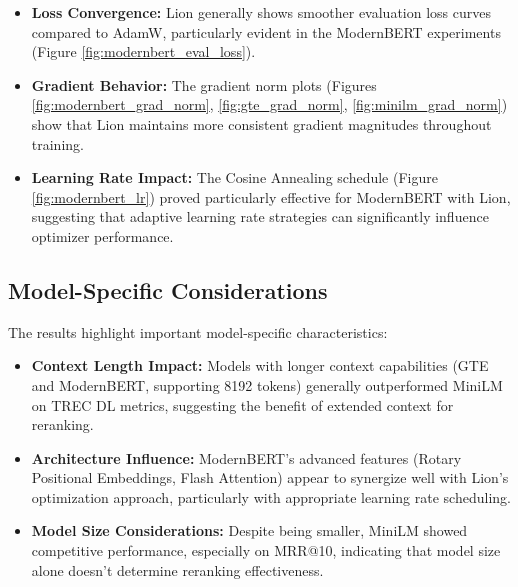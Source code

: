 \begin{itemize}
    \item \textbf{Loss Convergence:} Lion generally shows smoother evaluation loss curves compared to AdamW, particularly evident in the ModernBERT experiments (Figure \ref{fig:modernbert_eval_loss}).
    
    \item \textbf{Gradient Behavior:} The gradient norm plots (Figures \ref{fig:modernbert_grad_norm}, \ref{fig:gte_grad_norm}, \ref{fig:minilm_grad_norm}) show that Lion maintains more consistent gradient magnitudes throughout training.
    
    \item \textbf{Learning Rate Impact:} The Cosine Annealing schedule (Figure \ref{fig:modernbert_lr}) proved particularly effective for ModernBERT with Lion, suggesting that adaptive learning rate strategies can significantly influence optimizer performance.
\end{itemize}

\subsection{Model-Specific Considerations}

The results highlight important model-specific characteristics:

\begin{itemize}
    \item \textbf{Context Length Impact:} Models with longer context capabilities (GTE and ModernBERT, supporting 8192 tokens) generally outperformed MiniLM on TREC DL metrics, suggesting the benefit of extended context for reranking.
    
    \item \textbf{Architecture Influence:} ModernBERT's advanced features (Rotary Positional Embeddings, Flash Attention) appear to synergize well with Lion's optimization approach, particularly with appropriate learning rate scheduling.
    
    \item \textbf{Model Size Considerations:} Despite being smaller, MiniLM showed competitive performance, especially on MRR@10, indicating that model size alone doesn't determine reranking effectiveness.
\end{itemize}

